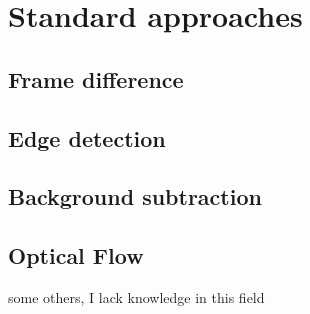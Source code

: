 \chapter{Standard approaches}

\section{Frame difference}
\section{Edge detection}
\section{Background subtraction}
\section{Optical Flow}

some others, I lack knowledge in this field